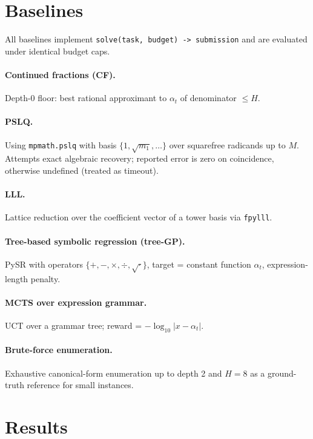 \documentclass[11pt]{article}
\begin{document}
\section{Baselines}
\label{sec:baselines}

All baselines implement \texttt{solve(task, budget) -> submission} and are evaluated under identical budget caps.

\paragraph{Continued fractions (CF).} Depth-0 floor: best rational approximant to $\alpha_t$ of denominator $\le H$.

\paragraph{PSLQ.} Using \texttt{mpmath.pslq} with basis $\{1, \sqrt{m_1}, \ldots\}$ over squarefree radicands up to $M$. Attempts exact algebraic recovery; reported error is zero on coincidence, otherwise undefined (treated as timeout).

\paragraph{LLL.} Lattice reduction over the coefficient vector of a tower basis via \texttt{fpylll}.

\paragraph{Tree-based symbolic regression (tree-GP).} PySR with operators $\{+,-,\times,\div,\sqrt{\cdot}\}$, target = constant function $\alpha_t$, expression-length penalty.

\paragraph{MCTS over expression grammar.} UCT over a grammar tree; reward = $-\log_{10} |x - \alpha_t|$.

\paragraph{Brute-force enumeration.} Exhaustive canonical-form enumeration up to depth 2 and $H = 8$ as a ground-truth reference for small instances.

\section{Results}
\label{sec:results}
\end{document}
